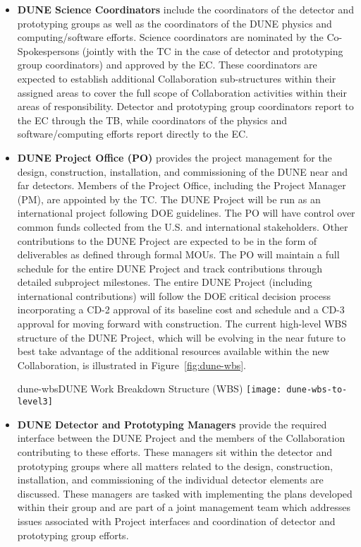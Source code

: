\begin{itemize}
\item \textbf{DUNE Science Coordinators} include the coordinators of the detector and prototyping groups as well as the coordinators of the DUNE physics and computing/software efforts.  Science coordinators are nominated by the Co-Spokespersons (jointly with the TC in the case of detector and prototyping group coordinators) and approved by the EC.  These coordinators are expected to establish additional Collaboration sub-structures within their assigned areas to cover the full scope of Collaboration activities within their areas of responsibility.  Detector and prototyping group coordinators report to the EC through the TB, while coordinators of the physics and software/computing efforts report directly to the EC.

\item \textbf{DUNE Project Office (PO)} provides the project management for the design, construction, installation, and commissioning of the DUNE near and far detectors.  Members of the Project Office, including the Project Manager (PM), are appointed by the  TC.  The DUNE Project will be run as an international project following DOE guidelines.  The PO will have control over common funds collected from the U.S. and international stakeholders.  Other contributions to the DUNE Project are expected to be in the form of deliverables as defined through formal MOUs. The PO will maintain a full schedule for the entire DUNE Project and track contributions through detailed subproject milestones.  The entire DUNE Project (including international contributions) will follow the DOE critical decision process incorporating a CD-2 approval of its baseline cost and schedule and a CD-3 approval for moving forward with construction.  The current high-level WBS structure of the DUNE Project, which will be evolving in the near future to best take advantage of the additional resources available within the new Collaboration, is illustrated in Figure~\ref{fig:dune-wbs}.

\begin{cdrfigure}{dune-wbs}{DUNE Work Breakdown Structure (WBS)}
  \texttt{[image: dune-wbs-to-level3]}
\end{cdrfigure}


\item \textbf{DUNE Detector and Prototyping Managers} provide the required interface between the DUNE Project and the members of the Collaboration contributing to these efforts.  These managers sit within the detector and prototyping groups where all matters related to the design, construction, installation, and commissioning of the individual detector elements are discussed.  These managers are tasked with implementing the plans developed within their group and are part of a joint management team which addresses issues associated with Project interfaces and coordination of detector and prototyping group efforts.
\end{itemize}

